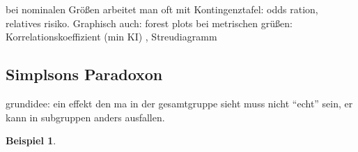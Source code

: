 \documentclass[a4paper]{article}
\theoremstyle{definition}
\newtheorem{beispiel}{Beispiel}
\theoremstyle{remark}
\begin{document}
bei nominalen Größen arbeitet man oft mit Kontingenztafel: odds ration, relatives risiko. Graphisch auch: forest plots
bei metrischen grüßen: Korrelationskoeffizient (min KI) , Streudiagramm
\subsection{Simplsons Paradoxon}
\label{sub:simplsons_paradoxon}

grundidee: ein effekt den ma in der gesamtgruppe sieht muss nicht ``echt'' sein, er kann in subgruppen anders ausfallen.
\begin{beispiel}
\end{beispiel}
\end{document}
